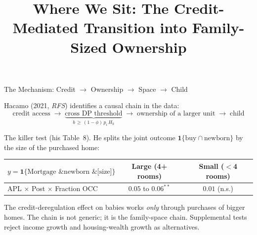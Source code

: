 \documentclass[11pt,aspectratio=169]{beamer}
\title{Where We Sit: The Credit-Mediated Transition into Family-Sized Ownership}
\date{}
\begin{document}
\maketitle

\begin{frame}{The Mechanism: Credit $\to$ Ownership $\to$ Space $\to$ Child}
\small

Hacamo (2021, \emph{RFS}) identifies a causal chain in the data:
\[
\text{credit access} \;\to\; \underbrace{\text{cross DP threshold}}_{b \,\geq\, (1-\phi)\,p_i\,H_k} \;\to\; \text{ownership of a larger unit} \;\to\; \text{child}
\]

\smallskip
The killer test (his Table~8). He splits the joint outcome $\mathbf{1}\{\text{buy} \cap \text{newborn}\}$ by the size of the purchased home:

\smallskip
\centering
\begin{tabular}{lcc}
\toprule
$y = \mathbf{1}\{\text{Mortgage \& newborn \& [size]}\}$ & \textbf{Large} (4+ rooms) & \textbf{Small} ($<$4 rooms)\\
\midrule
APL $\times$ Post $\times$ Fraction OCC & $0.05$ to $0.06^{**}$ & $0.01$ (n.s.)\\
\bottomrule
\end{tabular}

\smallskip\flushleft
The credit-deregulation effect on babies works \emph{only} through purchases of bigger homes. The chain is not generic; it is the family-space chain. Supplemental tests reject income growth and housing-wealth growth as alternatives.

\end{frame}
\end{document}
